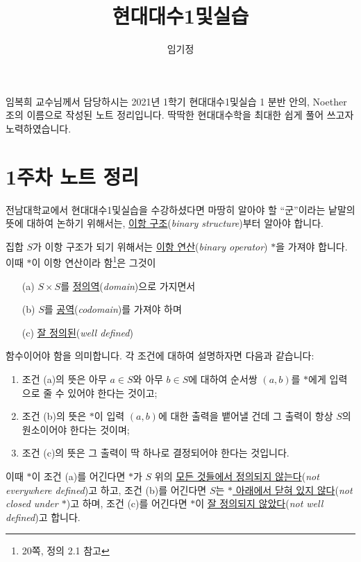 \documentclass[12pt]{paper}
\title{현대대수1및실습}
\author{임기정}
\begin{document}
  \nocite{fraleigh2009}

  \maketitle
  \hspace{12pt}
  
  임복희 교수님께서 담당하시는 2021년 1학기 현대대수1및실습 1 분반 안의, Noether 조의 이름으로 작성된 노트 정리입니다.
  딱딱한 현대대수학을 최대한 쉽게 풀어 쓰고자 노력하였습니다.

  \section{1주차 노트 정리}
  \hspace{12pt}

  전남대학교에서 현대대수1및실습을 수강하셨다면 마땅히 알아야 할 ``군''이라는 낱말의 뜻에 대하여 논하기 위해서는, \underline{이항 구조}(\textit{binary structure})부터 알아야 합니다.

  집합 $S$가 이항 구조가 되기 위해서는 \underline{이항 연산}(\textit{binary operator}) $*$을 가져야 합니다.
  이때 $*$이 이항 연산이라 함\footnote{\cite{fraleigh2009} 20쪽, 정의 2.1 참고}은 그것이
  \begin{enumerate}
    \item[(a)] $S \times S$를 \underline{정의역}(\textit{domain})으로 가지면서
    \item[(b)] $S$를 \underline{공역}(\textit{codomain})를 가져야 하며
    \item[(c)] \underline{잘 정의된}(\textit{well defined}) 
  \end{enumerate}
  함수이어야 함을 의미합니다.
  각 조건에 대하여 설명하자면 다음과 같습니다:
  \begin{enumerate}
    \item 조건 (a)의 뜻은 아무 $a \in S$와 아무 $b \in S$에 대하여 순서쌍 $\left( a , b \right)$를 $*$에게 입력으로 줄 수 있어야 한다는 것이고;
    \item 조건 (b)의 뜻은 $*$이 입력 $\left( a , b \right)$에 대한 출력을 뱉어낼 건데 그 출력이 항상 $S$의 원소이어야 한다는 것이며;
    \item 조건 (c)의 뜻은 그 출력이 딱 하나로 결정되어야 한다는 것입니다.
  \end{enumerate}
  
  이때 $*$이 조건 (a)를 어긴다면 $*$가 $S$ 위의 \underline{모든 것들에서 정의되지 않는다}(\textit{not everywhere defined})고 하고,
  조건 (b)를 어긴다면 $S$는 \underline{$*$ 아래에서 닫혀 있지 않다}(\textit{not closed under $*$})고 하며,
  조건 (c)를 어긴다면 $*$이 \underline{잘 정의되지 않았다}(\textit{not well defined})고 합니다.
\end{document}
